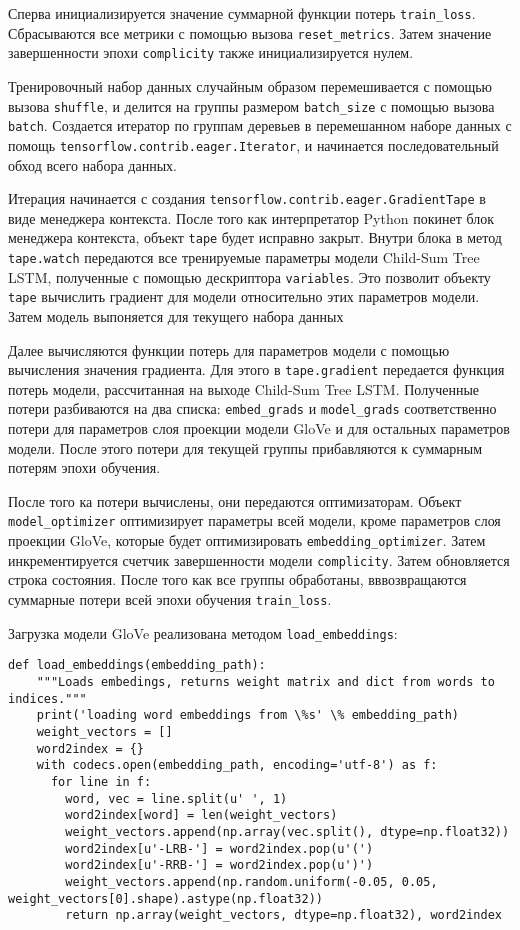 Сперва инициализируется значение суммарной функции потерь \texttt{tra\-in\_loss}. Сбрасываются все метрики с помощью вызова \texttt{reset\_metrics}. Затем значение завершенности эпохи \texttt{complicity} также инициализируется нулем.

Тренировочный набор данных случайным образом перемешивается с помощью вызова \texttt{shuffle}, и делится на группы размером \texttt{batch\_size} с помощью вызова \texttt{batch}. Создается итератор по группам деревьев в перемешанном наборе данных с помощь \texttt{tensorflow.contrib.eager.Iterator}, и начинается последовательный обход всего набора данных.

Итерация начинается с создания \texttt{tensorflow.contrib.eager.Gradi\-entTape} в виде менеджера контекста. После того как интерпретатор Python покинет блок менеджера контекста, объект \texttt{tape} будет исправно закрыт. Внутри блока в метод \texttt{tape.watch} передаются все тренируемые параметры модели Child-Sum Tree LSTM\@, полученные с помощью дескриптора \texttt{variables}. Это позволит объекту \texttt{tape} вычислить градиент для модели относительно этих параметров модели. Затем модель выпоняется для текущего набора данных

Далее вычисляются функции потерь для параметров модели с помощью вычисления значения градиента. Для этого в \texttt{tape.gradient} передается функция потерь модели, рассчитанная на выходе Child-Sum Tree LSTM\@. Полученные потери разбиваются на два списка: \texttt{embed\_grads} и \texttt{model\_grads} соответственно потери для параметров слоя проекции модели GloVe и для остальных параметров модели. После этого потери для текущей группы прибавляются к суммарным потерям эпохи обучения.

После того ка потери вычислены, они передаются оптимизаторам. Объект \texttt{model\_optimizer} оптимизирует параметры всей модели, кроме параметров слоя проекции GloVe, которые будет оптимизировать \texttt{embedding\_optimi\-zer}. Затем инкрементируется счетчик завершенности модели \texttt{complicity}. Затем обновляется строка состояния. После того как все группы обработаны, вввозвращаются суммарные потери всей эпохи обучения \texttt{train\_loss}.

Загрузка модели GloVe реализована методом \texttt{load\_embeddings}:
\medskip
\begin{lstlisting}[style=Python]
  def load_embeddings(embedding_path):
    """Loads embedings, returns weight matrix and dict from words to indices."""
    print('loading word embeddings from \%s' \% embedding_path)
    weight_vectors = []
    word2index = {}
    with codecs.open(embedding_path, encoding='utf-8') as f:
      for line in f:
        word, vec = line.split(u' ', 1)
        word2index[word] = len(weight_vectors)
        weight_vectors.append(np.array(vec.split(), dtype=np.float32))
        word2index[u'-LRB-'] = word2index.pop(u'(')
        word2index[u'-RRB-'] = word2index.pop(u')')
        weight_vectors.append(np.random.uniform(-0.05, 0.05, weight_vectors[0].shape).astype(np.float32))
        return np.array(weight_vectors, dtype=np.float32), word2index
\end{lstlisting}
\medskip
